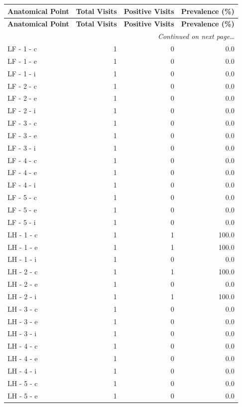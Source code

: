 \documentclass[a4paper,11pt]{article}
\begin{document}
\begin{small}
\begin{longtable}{p{5cm}rrr}
\toprule
\textbf{Anatomical Point} &
\textbf{Total Visits} &
\textbf{Positive Visits} &
\textbf{Prevalence (\%)} \\
\midrule
\endfirsthead
\toprule
\textbf{Anatomical Point} &
\textbf{Total Visits} &
\textbf{Positive Visits} &
\textbf{Prevalence (\%)} \\
\midrule
\endhead
\midrule
\multicolumn{4}{r}{\small\emph{Continued on next page\ldots}} \\
\endfoot
\bottomrule
\endlastfoot
LF - 1 - c & 1 & 0 & 0.0 \\
LF - 1 - e & 1 & 0 & 0.0 \\
LF - 1 - i & 1 & 0 & 0.0 \\
LF - 2 - c & 1 & 0 & 0.0 \\
LF - 2 - e & 1 & 0 & 0.0 \\
LF - 2 - i & 1 & 0 & 0.0 \\
LF - 3 - c & 1 & 0 & 0.0 \\
LF - 3 - e & 1 & 0 & 0.0 \\
LF - 3 - i & 1 & 0 & 0.0 \\
LF - 4 - c & 1 & 0 & 0.0 \\
LF - 4 - e & 1 & 0 & 0.0 \\
LF - 4 - i & 1 & 0 & 0.0 \\
LF - 5 - c & 1 & 0 & 0.0 \\
LF - 5 - e & 1 & 0 & 0.0 \\
LF - 5 - i & 1 & 0 & 0.0 \\
LH - 1 - c & 1 & 1 & 100.0 \\
LH - 1 - e & 1 & 1 & 100.0 \\
LH - 1 - i & 1 & 0 & 0.0 \\
LH - 2 - c & 1 & 1 & 100.0 \\
LH - 2 - e & 1 & 0 & 0.0 \\
LH - 2 - i & 1 & 1 & 100.0 \\
LH - 3 - c & 1 & 0 & 0.0 \\
LH - 3 - e & 1 & 0 & 0.0 \\
LH - 3 - i & 1 & 0 & 0.0 \\
LH - 4 - c & 1 & 0 & 0.0 \\
LH - 4 - e & 1 & 0 & 0.0 \\
LH - 4 - i & 1 & 0 & 0.0 \\
LH - 5 - c & 1 & 0 & 0.0 \\
LH - 5 - e & 1 & 0 & 0.0 \\

\end{longtable}
\end{small}
\end{document}
